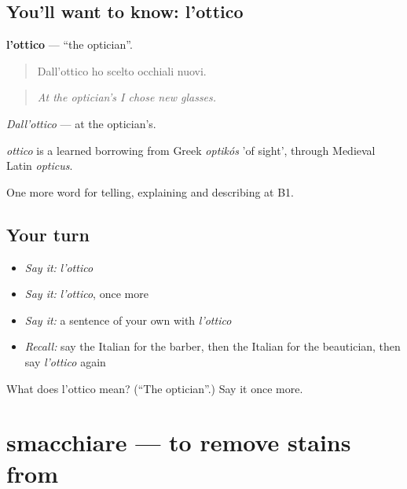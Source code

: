 \subsection*{You'll want to know: l'ottico}
\textbf{l'ottico} — \textquotedblleft{}the optician\textquotedblright{}.

\begin{quote}
Dall'ottico ho scelto occhiali nuovi.
\end{quote}

\begin{quote}
\emph{At the optician's I chose new glasses.}
\end{quote}

\emph{Dall'ottico} — at the optician's.

\begin{cousinweb}
\emph{ottico} is a learned borrowing from Greek \emph{optikós} 'of sight', through Medieval Latin \emph{opticus}.
\end{cousinweb}

\begin{grammarlens}[title={What you've built}]
One more word for telling, explaining and describing at B1.
\end{grammarlens}

\subsection*{Your turn}
\begin{itemize}
\raggedright
  \item \emph{Say it:} \emph{l'ottico}
  \item \emph{Say it:} \emph{l'ottico}, once more
  \item \emph{Say it:} a sentence of your own with \emph{l'ottico}
  \item \emph{Recall:} say the Italian for the barber, then the Italian for the beautician, then say \emph{l'ottico} again
\end{itemize}

\begin{tcolorbox}[breakable,colback=teal!4,colframe=teal!35!black,title={Before you move on}]
What does l'ottico mean? (\textquotedblleft{}The optician\textquotedblright{}.) Say it once more.
\end{tcolorbox}
\section[smacchiare]{smacchiare — to remove stains from}

